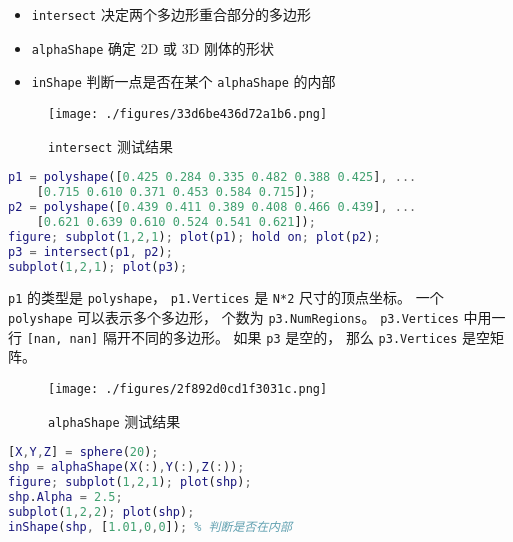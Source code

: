 
\begin{issues}
\issueDraft
\end{issues}

\begin{itemize}
\item \verb|intersect| 决定两个多边形重合部分的多边形
\item \verb|alphaShape| 确定 2D 或 3D 刚体的形状
\item \verb|inShape| 判断一点是否在某个 \verb|alphaShape| 的内部
\end{itemize}

\begin{figure}[ht]
\centering
\texttt{[image: ./figures/33d6be436d72a1b6.png]}
\caption{\lstinline|intersect| 测试结果} \label{fig_RigBMa_1}
\end{figure}

\begin{lstlisting}[language=matlab]
p1 = polyshape([0.425 0.284 0.335 0.482 0.388 0.425], ...
    [0.715 0.610 0.371 0.453 0.584 0.715]);
p2 = polyshape([0.439 0.411 0.389 0.408 0.466 0.439], ...
    [0.621 0.639 0.610 0.524 0.541 0.621]);
figure; subplot(1,2,1); plot(p1); hold on; plot(p2);
p3 = intersect(p1, p2);
subplot(1,2,1); plot(p3);
\end{lstlisting}
\verb|p1| 的类型是 \verb|polyshape|， \verb|p1.Vertices| 是 \verb|N*2| 尺寸的顶点坐标。 一个 \verb|polyshape| 可以表示多个多边形， 个数为 \verb|p3.NumRegions|。 \verb|p3.Vertices| 中用一行 \verb|[nan, nan]| 隔开不同的多边形。 如果 \verb|p3| 是空的， 那么 \verb|p3.Vertices| 是空矩阵。


\begin{figure}[ht]
\centering
\texttt{[image: ./figures/2f892d0cd1f3031c.png]}
\caption{\lstinline|alphaShape| 测试结果} \label{fig_RigBMa_2}
\end{figure}

\begin{lstlisting}[language=matlab]
[X,Y,Z] = sphere(20);
shp = alphaShape(X(:),Y(:),Z(:));
figure; subplot(1,2,1); plot(shp);
shp.Alpha = 2.5;
subplot(1,2,2); plot(shp);
inShape(shp, [1.01,0,0]); % 判断是否在内部
\end{lstlisting}
